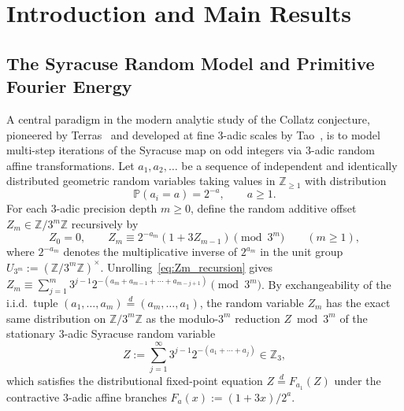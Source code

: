 \documentclass[11pt,a4paper]{article}
\numberwithin{equation}{section}
\theoremstyle{definition}
\theoremstyle{remark}
\newcommand{\Z}{\mathbb{Z}}
\renewcommand{\P}{\mathbb{P}}
\begin{document}
\begin{abstract}
\medskip
\noindent\textbf{2020 Mathematics Subject Classification:} Primary 11B83, 60J05; Secondary 43A25, 11K70, 60B15.

\noindent\textbf{Keywords:} Collatz conjecture, Syracuse random model, $3$-adic Fourier analysis, primitive Fourier energy, affine transfer operators, spectral gap, Lean~4 formalization.
\end{abstract}

\section{Introduction and Main Results}\label{sec:intro}

\subsection{The Syracuse Random Model and Primitive Fourier Energy}\label{subsec:syracuse_model_intro}

A central paradigm in the modern analytic study of the Collatz conjecture, pioneered by Terras~\cite{Terras1976} and developed at fine $3$-adic scales by Tao~\cite{Tao2019}, is to model multi-step iterations of the Syracuse map on odd integers via $3$-adic random affine transformations. Let $a_1, a_2, \dots$ be a sequence of independent and identically distributed geometric random variables taking values in $\Z_{\ge 1}$ with distribution
\begin{equation}\label{eq:geom_law}
\P(a_i = a) = 2^{-a}, \qquad a \ge 1.
\end{equation}
For each $3$-adic precision depth $m \ge 0$, define the random additive offset $Z_m \in \Z/3^m\Z$ recursively by
\begin{equation}\label{eq:Zm_recursion}
Z_0 = 0, \qquad Z_m \equiv 2^{-a_m}(1 + 3 Z_{m-1}) \pmod{3^m} \qquad (m \ge 1),
\end{equation}
where $2^{-a_m}$ denotes the multiplicative inverse of $2^{a_m}$ in the unit group $U_{3^m} := (\Z/3^m\Z)^\times$. Unrolling~\eqref{eq:Zm_recursion} gives $Z_m \equiv \sum_{j=1}^m 3^{j-1} 2^{-(a_m + a_{m-1} + \cdots + a_{m-j+1})} \pmod{3^m}$. By exchangeability of the i.i.d.\ tuple $(a_1, \dots, a_m) \stackrel{d}{=} (a_m, \dots, a_1)$, the random variable $Z_m$ has the exact same distribution on $\Z/3^m\Z$ as the modulo-$3^m$ reduction $Z \bmod 3^m$ of the stationary $3$-adic Syracuse random variable
\begin{equation}\label{eq:Z_stationary_series}
Z := \sum_{j=1}^\infty 3^{j-1} 2^{-(a_1 + \cdots + a_j)} \in \Z_3,
\end{equation}
which satisfies the distributional fixed-point equation $Z \stackrel{d}{=} F_{a_1}(Z)$ under the contractive $3$-adic affine branches $F_a(x) := (1 + 3x)/2^a$.
\end{document}

